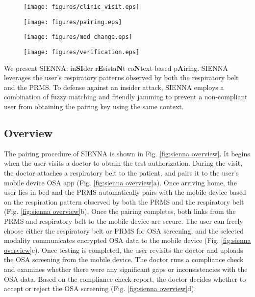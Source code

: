 \begin{figure*}[t]
\begin{subfigure}[t]{0.24\textwidth}
\texttt{[image: figures/clinic\_visit.eps]}
\end{subfigure}
\hspace{\fill}
\begin{subfigure}[t]{0.24\textwidth}
\texttt{[image: figures/pairing.eps]}
\end{subfigure}
\hspace{\fill}
\begin{subfigure}[t]{0.24\textwidth}
\texttt{[image: figures/mod\_change.eps]}
\end{subfigure}
\hspace{\fill}
\begin{subfigure}[t]{0.24\textwidth}
\texttt{[image: figures/verification.eps]}
\end{subfigure}
\caption{Left to right: (a) In hospital: a medical technician places a respiratory belt on a user and pairs it with the user's phone; (b) At home: a user pairs the PRMS with the user's phone; (c) User switches to PRMS for OSA screening; (d) Doctor verifies OSA data for any abnormalities.}
\label{fig:sienna overview}
\end{figure*}

We present SIENNA: in\textbf{SI}der r\textbf{E}sista\textbf{N}t co\textbf{N}text-based p\textbf{A}iring. SIENNA leverages the user's respiratory patterns observed by both the respiratory belt and the PRMS. To defense against an insider attack, SIENNA employs a combination of fuzzy matching and friendly jamming to prevent a non-compliant user from obtaining the pairing key using the same context.

\subsection{Overview}
The pairing procedure of SIENNA is shown in Fig. \ref{fig:sienna overview}. It begins when the user visits a doctor to obtain the test authorization. During the visit, the doctor attaches a respiratory belt to the patient, and pairs it to the user's mobile device OSA app (Fig. \ref{fig:sienna overview}a). Once arriving home, the user lies in bed and the PRMS automatically pairs with the mobile device based on the respiration pattern observed by both the PRMS and the respiratory belt (Fig. \ref{fig:sienna overview}b). Once the pairing completes, both links from the PRMS and respiratory belt to the mobile device are secure. The user can freely choose either the respiratory belt or PRMS for OSA screening, and the selected modality communicates encrypted OSA data to the mobile device (Fig. \ref{fig:sienna overview}c). Once testing is completed, the user revisits the doctor and uploads the OSA screening from the mobile device. The doctor runs a compliance check and examines whether there were any significant gaps or inconsistencies with the OSA data. Based on the compliance check report, the doctor decides whether to accept or reject the OSA screening (Fig. \ref{fig:sienna overview}d).

